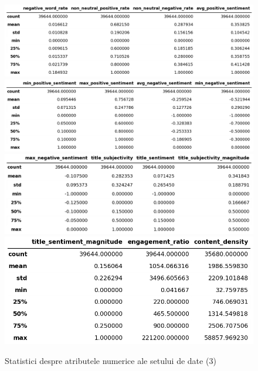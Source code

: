 \documentclass{article}
\begin{document}
\begin{figure}[htb]
    \centering
    \includegraphics[scale=0.4]{news_popularity/analysis/numeric/table9.png}
    \includegraphics[scale=0.4]{news_popularity/analysis/numeric/table10.png}
    \includegraphics[scale=0.4]{news_popularity/analysis/numeric/table11.png}
    \includegraphics[scale=0.4]{news_popularity/analysis/numeric/table12.png}
    \caption{Statistici despre atributele numerice ale setului de date (3)}
    \label{fig:news:num_attr3}
\end{figure}
\end{document}

